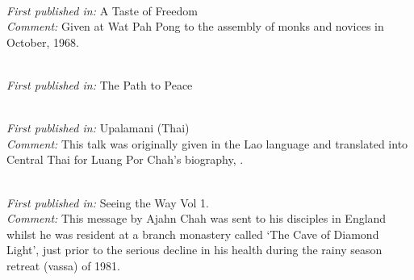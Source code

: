  \\
\textit{First published in:} A Taste of Freedom \\
\textit{Comment:} Given at Wat Pah Pong to the assembly of monks and novices in October, 1968.

\clearpage

 \\
\textit{First published in:} The Path to Peace

 \\
\textit{First published in:} Upalamani (Thai) \\
\textit{Comment:} This talk was originally given in the Lao language and translated into Central Thai for Luang Por Chah's biography, .

 \\
\textit{First published in:} Seeing the Way Vol 1. \\
\textit{Comment:} This message by Ajahn Chah was sent to his disciples in England whilst he was resident at a branch monastery called `The Cave of Diamond Light', just prior to the serious decline in his health during the rainy season retreat (vassa) of 1981.

